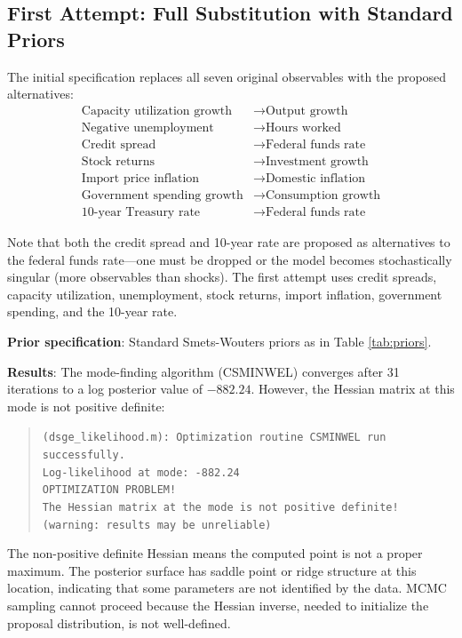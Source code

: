 \documentclass[12pt]{article}
\begin{document}
\subsection{First Attempt: Full Substitution with Standard Priors}

The initial specification replaces all seven original observables with the proposed alternatives:
\begin{align*}
\text{Capacity utilization growth} &\rightarrow \text{Output growth} \\
\text{Negative unemployment} &\rightarrow \text{Hours worked} \\
\text{Credit spread} &\rightarrow \text{Federal funds rate} \\
\text{Stock returns} &\rightarrow \text{Investment growth} \\
\text{Import price inflation} &\rightarrow \text{Domestic inflation} \\
\text{Government spending growth} &\rightarrow \text{Consumption growth} \\
\text{10-year Treasury rate} &\rightarrow \text{Federal funds rate}
\end{align*}

Note that both the credit spread and 10-year rate are proposed as alternatives to the federal funds rate---one must be dropped or the model becomes stochastically singular (more observables than shocks). The first attempt uses credit spreads, capacity utilization, unemployment, stock returns, import inflation, government spending, and the 10-year rate.

\textbf{Prior specification}: Standard Smets-Wouters priors as in Table \ref{tab:priors}.

\textbf{Results}: The mode-finding algorithm (CSMINWEL) converges after 31 iterations to a log posterior value of $-882.24$. However, the Hessian matrix at this mode is not positive definite:

\begin{quote}
\texttt{(dsge\_likelihood.m): Optimization routine CSMINWEL run successfully.}\\
\texttt{Log-likelihood at mode: -882.24}\\
\texttt{OPTIMIZATION PROBLEM!}\\
\texttt{The Hessian matrix at the mode is not positive definite!}\\
\texttt{(warning: results may be unreliable)}
\end{quote}

The non-positive definite Hessian means the computed point is not a proper maximum. The posterior surface has saddle point or ridge structure at this location, indicating that some parameters are not identified by the data. MCMC sampling cannot proceed because the Hessian inverse, needed to initialize the proposal distribution, is not well-defined.
\end{document}
